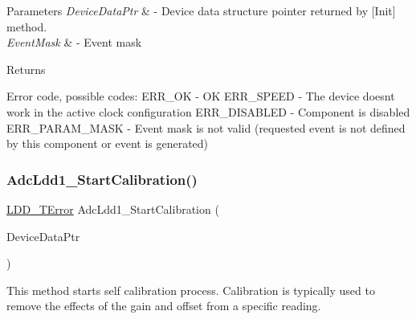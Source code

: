 \begin{DoxyParams}{Parameters}
{\em Device\+Data\+Ptr} & -\/ Device data structure pointer returned by \mbox{[}Init\mbox{]} method. \\
\hline
{\em Event\+Mask} & -\/ Event mask \\
\hline
\end{DoxyParams}
\begin{DoxyReturn}{Returns}

\begin{DoxyItemize}
\item Error code, possible codes\+: E\+R\+R\+\_\+\+OK -\/ OK E\+R\+R\+\_\+\+S\+P\+E\+ED -\/ The device doesn\textquotesingle{}t work in the active clock configuration E\+R\+R\+\_\+\+D\+I\+S\+A\+B\+L\+ED -\/ Component is disabled E\+R\+R\+\_\+\+P\+A\+R\+A\+M\+\_\+\+M\+A\+SK -\/ Event mask is not valid (requested event is not defined by this component or event is generated) 
\end{DoxyItemize}
\end{DoxyReturn}
\mbox{\label{group___adc_ldd1__module_gab9d49b5f1a7ef34cde56046754ebb62a}} 
\subsubsection{\texorpdfstring{Adc\+Ldd1\+\_\+\+Start\+Calibration()}{AdcLdd1\_StartCalibration()}}
{\footnotesize\ttfamily \hyperlink{group___p_e___types__module_ga24c2b045fd04e79e85f261ce4df35588}{L\+D\+D\+\_\+\+T\+Error} Adc\+Ldd1\+\_\+\+Start\+Calibration (\begin{DoxyParamCaption}\item[{\hyperlink{group___p_e___types__module_gac5cf1362f1f0e3a2ce71b1bf2276d091}{L\+D\+D\+\_\+\+T\+Device\+Data} $\ast$}]{Device\+Data\+Ptr }\end{DoxyParamCaption})}



This method starts self calibration process. Calibration is typically used to remove the effects of the gain and offset from a specific reading. 


